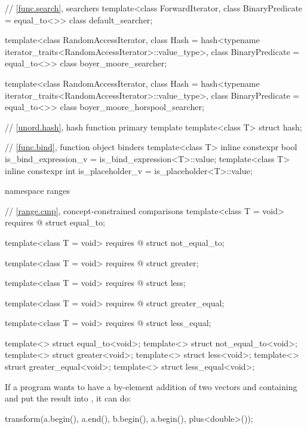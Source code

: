 \begin{codeblock}
{  // \ref{func.search}, searchers
  template<class ForwardIterator, class BinaryPredicate = equal_to<>>
    class default_searcher;

  template<class RandomAccessIterator,
           class Hash = hash<typename iterator_traits<RandomAccessIterator>::value_type>,
           class BinaryPredicate = equal_to<>>
    class boyer_moore_searcher;

  template<class RandomAccessIterator,
           class Hash = hash<typename iterator_traits<RandomAccessIterator>::value_type>,
           class BinaryPredicate = equal_to<>>
    class boyer_moore_horspool_searcher;

  // \ref{unord.hash}, hash function primary template
  template<class T>
    struct hash;

  // \ref{func.bind}, function object binders
  template<class T>
    inline constexpr bool is_bind_expression_v = is_bind_expression<T>::value;
  template<class T>
    inline constexpr int is_placeholder_v = is_placeholder<T>::value;

  namespace ranges {
    // \ref{range.cmp}, concept-constrained comparisons
    template<class T = void>
      requires @\seebelow@
    struct equal_to;

    template<class T = void>
      requires @\seebelow@
    struct not_equal_to;

    template<class T = void>
      requires @\seebelow@
    struct greater;

    template<class T = void>
      requires @\seebelow@
    struct less;

    template<class T = void>
      requires @\seebelow@
    struct greater_equal;

    template<class T = void>
      requires @\seebelow@
    struct less_equal;

    template<> struct equal_to<void>;
    template<> struct not_equal_to<void>;
    template<> struct greater<void>;
    template<> struct less<void>;
    template<> struct greater_equal<void>;
    template<> struct less_equal<void>;
  }
}
\end{codeblock}

\pnum
\begin{example}
If a \Cpp{} program wants to have a by-element addition of two vectors 
and  containing  and put the result into ,
it can do:

\begin{codeblock}
transform(a.begin(), a.end(), b.begin(), a.begin(), plus<double>());
\end{codeblock}
\end{example}

